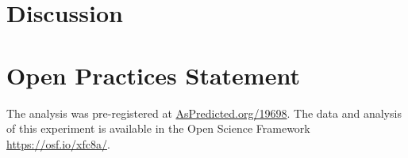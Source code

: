 \documentclass[12pt]{article}
\begin{document}
\section{Discussion}

\section{Open Practices Statement}
The analysis was pre-registered at \url{AsPredicted.org/19698}. The data and analysis of this experiment is available in the Open Science Framework \url{https://osf.io/xfc8a/}. 

\newpage


\end{document}
